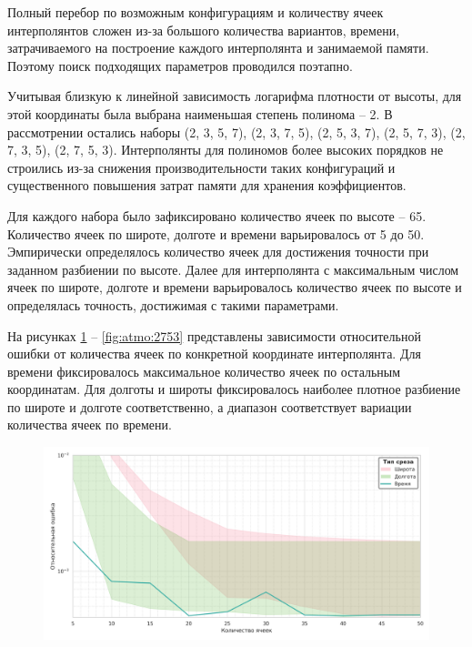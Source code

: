 Полный перебор по возможным конфигурациям и количеству ячеек интерполянтов сложен
из-за большого количества вариантов, времени, затрачиваемого на построение каждого интерполянта и
занимаемой памяти. Поэтому поиск подходящих параметров проводился поэтапно.

Учитывая близкую к линейной зависимость логарифма плотности от высоты, для этой координаты
была выбрана наименьшая степень полинома -- 2. В рассмотрении остались наборы 
(2, 3, 5, 7), (2, 3, 7, 5), (2, 5, 3, 7), (2, 5, 7, 3), (2, 7, 3, 5),
(2, 7, 5, 3). Интерполянты для полиномов более
высоких порядков не строились из-за снижения производительности таких конфигураций и
существенного повышения затрат памяти для хранения коэффициентов.

Для каждого набора было зафиксировано количество ячеек по высоте -- 65. Количество ячеек
по широте, долготе и времени варьировалось от 5 до 50. Эмпирически определялось
количество ячеек для достижения точности при заданном разбиении по высоте. Далее
для интерполянта с максимальным числом ячеек по широте, долготе и времени варьировалось
количество ячеек по высоте и определялась точность, достижимая с такими параметрами.

На рисунках \ref{fig:atmo:2357} -- \ref{fig:atmo:2753} представлены зависимости относительной ошибки от количества ячеек по
конкретной координате интерполянта. Для времени фиксировалось
максимальное количество ячеек по остальным координатам. Для долготы и широты
фиксировалось наиболее плотное разбиение по широте и долготе соответственно, а диапазон
соответствует вариации количества ячеек по времени.

\begin{figure}[h!]
    \centering
    \includegraphics[width=\linewidth]{../images/solution/atmo/2357.png}
    \label{fig:atmo:2357}
 \end{figure}

